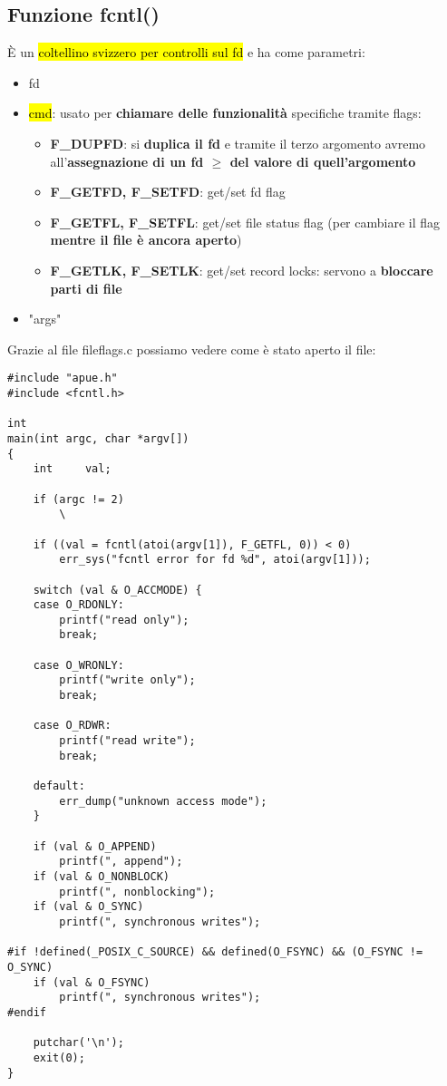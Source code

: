 \subsection{Funzione fcntl()}

È un \hl{coltellino svizzero per controlli sul fd} e ha come parametri: 

\begin{itemize}
	\item fd
	\item \hl{cmd}: usato per \textbf{chiamare delle funzionalità} specifiche tramite flags:

		\begin{itemize}
			\item \textbf{F\_DUPFD}: si \textbf{duplica il fd} e tramite il terzo argomento avremo all'\textbf{assegnazione di un fd $\geq$ del valore di quell'argomento}
			\item \textbf{F\_GETFD, F\_SETFD}: get/set fd flag
			\item \textbf{F\_GETFL, F\_SETFL}: get/set file status flag (per cambiare il flag \textbf{mentre il file è ancora aperto})
			\item \textbf{F\_GETLK, F\_SETLK}: get/set record locks: servono a \textbf{bloccare parti di file}
		\end{itemize}
	
	\item "args"
\end{itemize}

Grazie al file fileflags.c possiamo vedere come è stato aperto il file:

\begin{lstlisting}
#include "apue.h"
#include <fcntl.h>

int
main(int argc, char *argv[])
{
	int		val;

	if (argc != 2)
		\

	if ((val = fcntl(atoi(argv[1]), F_GETFL, 0)) < 0)
		err_sys("fcntl error for fd %d", atoi(argv[1]));

	switch (val & O_ACCMODE) {
	case O_RDONLY:
		printf("read only");
		break;

	case O_WRONLY:
		printf("write only");
		break;

	case O_RDWR:
		printf("read write");
		break;

	default:
		err_dump("unknown access mode");
	}

	if (val & O_APPEND)
		printf(", append");
	if (val & O_NONBLOCK)
		printf(", nonblocking");
	if (val & O_SYNC)
		printf(", synchronous writes");

#if !defined(_POSIX_C_SOURCE) && defined(O_FSYNC) && (O_FSYNC != O_SYNC)
	if (val & O_FSYNC)
		printf(", synchronous writes");
#endif

	putchar('\n');
	exit(0);
}	
\end{lstlisting}

